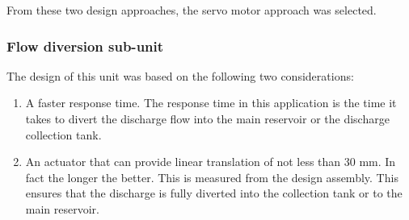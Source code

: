 From these two design approaches, the servo motor approach was selected.

\subsubsection{Flow diversion sub-unit}
The design of this unit was based on the following two considerations:
\begin{enumerate}
    \item A faster response time. The response time in this application is the time it takes to divert the discharge flow into the main reservoir or the discharge collection tank. 
    \item An actuator that can provide linear translation of not less than 30 mm. In fact the longer the better. This is measured from the design assembly. This ensures that the discharge is fully diverted into the collection tank or to the main reservoir. 
\end{enumerate}

